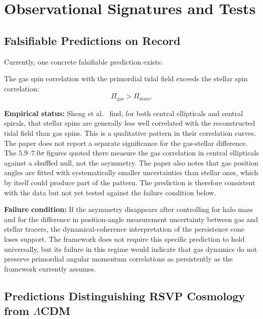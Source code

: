 \documentclass[12pt,a4paper,twoside,openright]{book}
\theoremstyle{plain}
\theoremstyle{definition}
\theoremstyle{remark}
\begin{document}
\chapter{Observational Signatures and Tests}
\label{ch:observations}

\section{Falsifiable Predictions on Record}

Currently, one concrete falsifiable prediction exists:

\begin{prediction}
The gas spin correlation with the primordial tidal field exceeds the stellar spin correlation:
\[
\Pi_{\mathrm{gas}} > \Pi_{\mathrm{stars}}.
\]

\textbf{Empirical status:} Sheng et al.\ \cite{sheng2026tidaltorque} find, for both central ellipticals and central spirals, that stellar spins are generally less well correlated with the reconstructed tidal field than gas spins. This is a qualitative pattern in their correlation curves. The paper does not report a separate significance for the gas-stellar difference. The $5.9$--$7.0\sigma$ figures quoted there measure the gas correlation in central ellipticals against a shuffled null, not the asymmetry. The paper also notes that gas position angles are fitted with systematically smaller uncertainties than stellar ones, which by itself could produce part of the pattern. The prediction is therefore consistent with the data but not yet tested against the failure condition below.

\textbf{Failure condition:} If the asymmetry disappears after controlling for halo mass and for the difference in position-angle measurement uncertainty between gas and stellar tracers, the dynamical-coherence interpretation of the persistence cone loses support. The framework does not require this specific prediction to hold universally, but its failure in this regime would indicate that gas dynamics do not preserve primordial angular momentum correlations as persistently as the framework currently assumes.
\end{prediction}

\section{Predictions Distinguishing RSVP Cosmology from \texorpdfstring{$\Lambda$}{Lambda}CDM}
\end{document}
